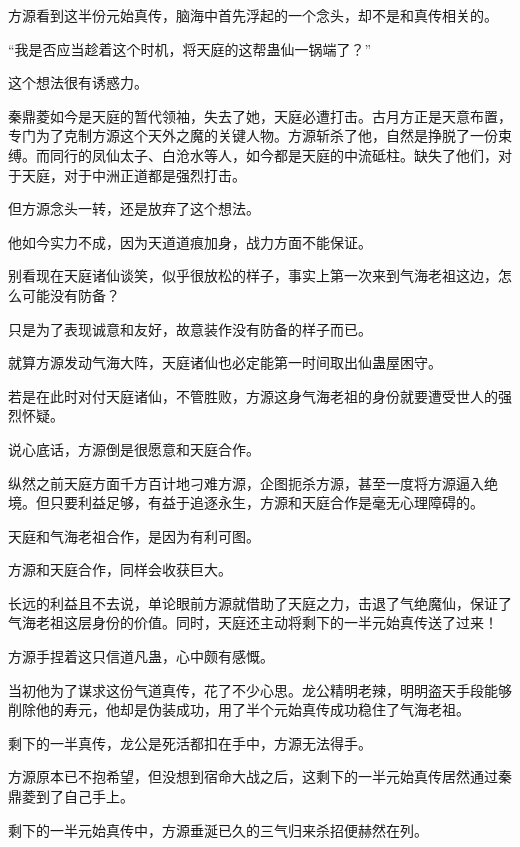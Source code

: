 
\begin{this_body}

方源看到这半份元始真传，脑海中首先浮起的一个念头，却不是和真传相关的。

“我是否应当趁着这个时机，将天庭的这帮蛊仙一锅端了？”

这个想法很有诱惑力。

秦鼎菱如今是天庭的暂代领袖，失去了她，天庭必遭打击。古月方正是天意布置，专门为了克制方源这个天外之魔的关键人物。方源斩杀了他，自然是挣脱了一份束缚。而同行的凤仙太子、白沧水等人，如今都是天庭的中流砥柱。缺失了他们，对于天庭，对于中洲正道都是强烈打击。

但方源念头一转，还是放弃了这个想法。

他如今实力不成，因为天道道痕加身，战力方面不能保证。

别看现在天庭诸仙谈笑，似乎很放松的样子，事实上第一次来到气海老祖这边，怎么可能没有防备？

只是为了表现诚意和友好，故意装作没有防备的样子而已。

就算方源发动气海大阵，天庭诸仙也必定能第一时间取出仙蛊屋困守。

若是在此时对付天庭诸仙，不管胜败，方源这身气海老祖的身份就要遭受世人的强烈怀疑。

说心底话，方源倒是很愿意和天庭合作。

纵然之前天庭方面千方百计地刁难方源，企图扼杀方源，甚至一度将方源逼入绝境。但只要利益足够，有益于追逐永生，方源和天庭合作是毫无心理障碍的。

天庭和气海老祖合作，是因为有利可图。

方源和天庭合作，同样会收获巨大。

长远的利益且不去说，单论眼前方源就借助了天庭之力，击退了气绝魔仙，保证了气海老祖这层身份的价值。同时，天庭还主动将剩下的一半元始真传送了过来！

方源手捏着这只信道凡蛊，心中颇有感慨。

当初他为了谋求这份气道真传，花了不少心思。龙公精明老辣，明明盗天手段能够削除他的寿元，他却是伪装成功，用了半个元始真传成功稳住了气海老祖。

剩下的一半真传，龙公是死活都扣在手中，方源无法得手。

方源原本已不抱希望，但没想到宿命大战之后，这剩下的一半元始真传居然通过秦鼎菱到了自己手上。

剩下的一半元始真传中，方源垂涎已久的三气归来杀招便赫然在列。


\end{this_body}

